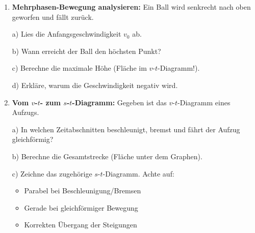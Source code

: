 \documentclass[11pt, a4paper]{article}
\begin{document}
\begin{enumerate}[resume]
    b) Berechne den Weg nach jeder Phase.

    c) Zeichne das $s$-$t$-Diagramm mit korrekter Beschriftung.

    d) Zeichne das $v$-$t$-Diagramm.

    \item \textbf{Mehrphasen-Bewegung analysieren:} Ein Ball wird senkrecht nach oben geworfen und fällt zurück.

\begin{center}
\end{center}

    a) Lies die Anfangsgeschwindigkeit $v_0$ ab.

    b) Wann erreicht der Ball den höchsten Punkt?

    c) Berechne die maximale Höhe (Fläche im $v$-$t$-Diagramm!).

    d) Erkläre, warum die Geschwindigkeit negativ wird.

    \item \textbf{Vom $v$-$t$- zum $s$-$t$-Diagramm:} Gegeben ist das $v$-$t$-Diagramm eines Aufzugs.

\begin{center}
\end{center}

    a) In welchen Zeitabschnitten beschleunigt, bremst und fährt der Aufzug gleichförmig?

    b) Berechne die Gesamtstrecke (Fläche unter dem Graphen).

    c) Zeichne das zugehörige $s$-$t$-Diagramm. Achte auf:
    \begin{itemize}[leftmargin=1.5em]
        \item Parabel bei Beschleunigung/Bremsen
        \item Gerade bei gleichförmiger Bewegung
        \item Korrekten Übergang der Steigungen
    \end{itemize}
\end{enumerate}
\end{document}
